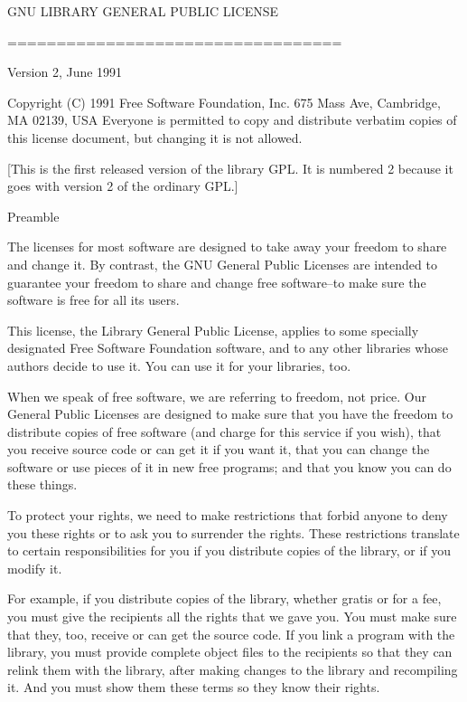 \documentclass[twoside]{tceusermanual}
\begin{document}
\begin{center}
    GNU LIBRARY GENERAL PUBLIC LICENSE

    ==================================

                Version 2, June 1991

 Copyright (C) 1991 Free Software Foundation, Inc.
                    675 Mass Ave, Cambridge, MA 02139, USA
 Everyone is permitted to copy and distribute verbatim copies
 of this license document, but changing it is not allowed.

[This is the first released version of the library GPL.  It is
 numbered 2 because it goes with version 2 of the ordinary GPL.]

Preamble
\end{center}

The licenses for most software are designed to take away your
freedom to share and change it.  By contrast, the GNU General
Public Licenses are intended to guarantee your freedom to share
and change free software--to make sure the software is free for
all its users.

This license, the Library General Public License, applies to
some specially designated Free Software Foundation software, and
to any other libraries whose authors decide to use it.  You can
use it for your libraries, too.

When we speak of free software, we are referring to freedom, not
price.  Our General Public Licenses are designed to make sure
that you have the freedom to distribute copies of free software
(and charge for this service if you wish), that you receive
source code or can get it if you want it, that you can change
the software or use pieces of it in new free programs; and that
you know you can do these things.

To protect your rights, we need to make restrictions that forbid
anyone to deny you these rights or to ask you to surrender the
rights. These restrictions translate to certain responsibilities
for you if you distribute copies of the library, or if you
modify it.

For example, if you distribute copies of the library, whether
gratis or for a fee, you must give the recipients all the rights
that we gave you.  You must make sure that they, too, receive or
can get the source code.  If you link a program with the
library, you must provide complete object files to the
recipients so that they can relink them with the library, after
making changes to the library and recompiling it.  And you must
show them these terms so they know their rights.
\end{document}
